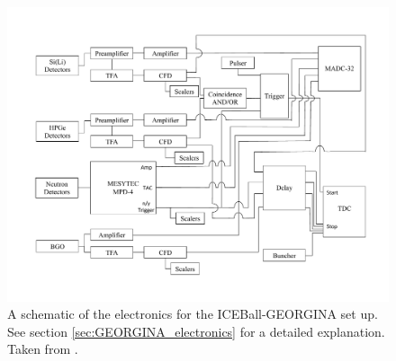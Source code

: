 \begin{figure}[hbt!]
    \centering
    \includegraphics[scale=0.5]{Setup_Figs/electronics-diagram.pdf}
    \caption{A schematic of the electronics for the ICEBall-GEORGINA set up. See section \ref{sec:GEORGINA_electronics} for a detailed explanation. Taken from \citep{battaglia15:_iceball_176lu}.}
    \label{fig:iceball_electronics}
\end{figure}